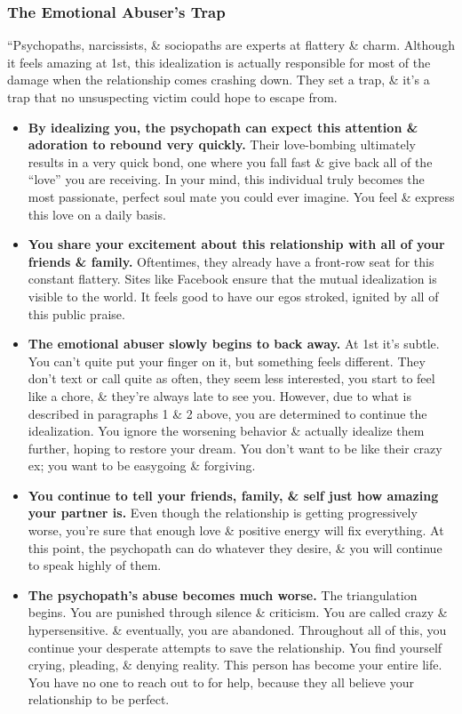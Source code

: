 \documentclass{article}
\numberwithin{equation}{section}
\begin{document}
\subsubsection{The Emotional Abuser's Trap}
``Psychopaths, narcissists, \& sociopaths are experts at flattery \& charm. Although it feels amazing at 1st, this idealization is actually responsible for most of the damage when the relationship comes crashing down. They set a trap, \& it's a trap that no unsuspecting victim could hope to escape from.
\begin{itemize}
	\item \textbf{By idealizing you, the psychopath can expect this attention \& adoration to rebound very quickly.} Their love-bombing ultimately results in a very quick bond, one where you fall fast \& give back all of the ``love'' you are receiving. In your mind, this individual truly becomes the most passionate, perfect soul mate you could ever imagine. You feel \& express this love on a daily basis.
	\item \textbf{You share your excitement about this relationship with all of your friends \& family.} Oftentimes, they already have a front-row seat for this constant flattery. Sites like Facebook ensure that the mutual idealization is visible to the world. It feels good to have our egos stroked, ignited by all of this public praise.
	\item \textbf{The emotional abuser slowly begins to back away.} At 1st it's subtle. You can't quite put your finger on it, but something feels different. They don't text or call quite as often, they seem less interested, you start to feel like a chore, \& they're always late to see you. However, due to what is described in paragraphs 1 \& 2 above, you are determined to continue the idealization. You ignore the worsening behavior \& actually idealize them further, hoping to restore your dream. You don't want to be like their crazy ex; you want to be easygoing \& forgiving.
	\item \textbf{You continue to tell your friends, family, \& self just how amazing your partner is.} Even though the relationship is getting progressively worse, you're sure that enough love \& positive energy will fix everything. At this point, the psychopath can do whatever they desire, \& you will continue to speak highly of them.
	\item \textbf{The psychopath's abuse becomes much worse.} The triangulation begins. You are punished through silence \& criticism. You are called crazy \& hypersensitive. \& eventually, you are abandoned. Throughout all of this, you continue your desperate attempts to save the relationship. You find yourself crying, pleading, \& denying reality. This person has become your entire life. You have no one to reach out to for help, because they all believe your relationship to be perfect.

\end{itemize}
\end{document}
